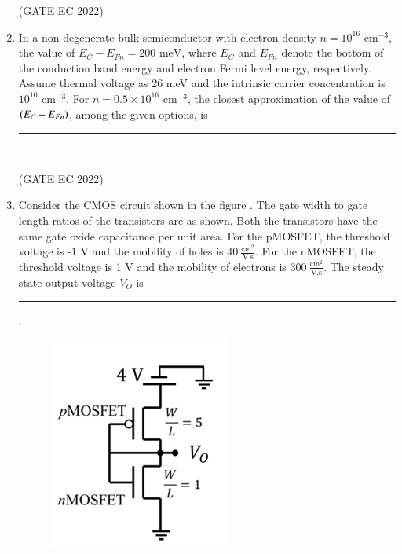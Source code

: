\documentclass[journal,12pt,onecolumn]{IEEEtran}
\theoremstyle{remark}
\begin{document}
\begin{enumerate}
    \hfill{(GATE EC 2022)}
    \begin{enumerate}
    \end{enumerate}

    \item In a non-degenerate bulk semiconductor with electron density $n = 10^{16} \text{ cm}^{-3}$, the value of $E_C - E_{Fn} = 200 \text{ meV}$, where $E_C$ and $E_{Fn}$ denote the bottom of the conduction band energy and electron Fermi level energy, respectively. Assume thermal voltage as 26 meV and the intrinsic carrier concentration is $10^{10} \text{ cm}^{-3}$. For $n = 0.5 \times 10^{16} \text{ cm}^{-3}$, the closest approximation of the value of $\left(E_C - E_{Fn}\right)$, among the given options, is \rule{2cm}{0.4pt}.

    \hfill{(GATE EC 2022)}
    \begin{enumerate}
    \end{enumerate}
    
    \item Consider the CMOS circuit shown in the figure . The gate width  to gate length  ratios  of the transistors are as shown. Both the transistors have the same gate oxide capacitance per unit area. For the pMOSFET, the threshold voltage is -1 V and the mobility of holes is $40 \ \frac{\text{cm}^2}{\text{V.s}}$. For the nMOSFET, the threshold voltage is 1 V and the mobility of electrons is $300 \ \frac{\text{cm}^2}{\text{V.s}}$. The steady state output voltage $V_O$ is \rule{2cm}{0.4pt}.
    \begin{figure}[H]
        \centering
        \includegraphics[width=0.3\columnwidth]{figs/m7.jpg}
        \caption*{}
        \label{fig:m7}
    \end{figure}
    

\end{enumerate}
\end{document}
